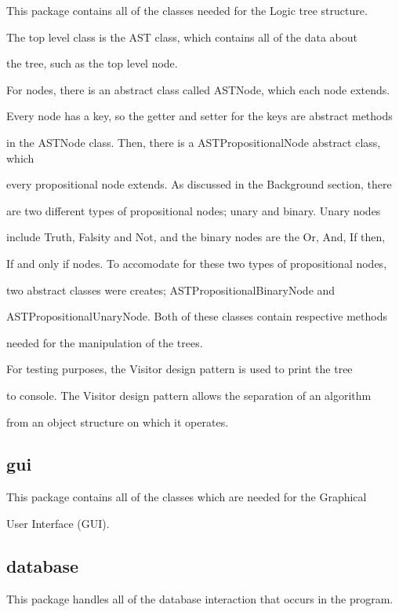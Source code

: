 \documentclass{report}
\begin{document}
This package contains all of the classes needed for the Logic tree structure.

The top level class is the AST class, which contains all of the data about

the tree, such as the top level node.



For nodes, there is an abstract class called ASTNode, which each node extends.

Every node has a key, so the getter and setter for the keys are abstract methods

in the ASTNode class. Then, there is a ASTPropositionalNode abstract class, which

every propositional node extends. As discussed in the Background section, there

are two different types of propositional nodes; unary and binary. Unary nodes

include Truth, Falsity and Not, and the binary nodes are the Or, And, If then,

If and only if nodes. To accomodate for these two types of propositional nodes,

two abstract classes were creates; ASTPropositionalBinaryNode and

ASTPropositionalUnaryNode. Both of these classes contain respective methods

needed for the manipulation of the trees.



For testing purposes, the Visitor design pattern is used to print the tree

to console. The Visitor design pattern allows the separation of an algorithm

from an object structure on which it operates.



\subsection{gui}

This package contains all of the classes which are needed for the Graphical

User Interface (GUI).



\subsection{database}

This package handles all of the database interaction that occurs in the program.
\end{document}
